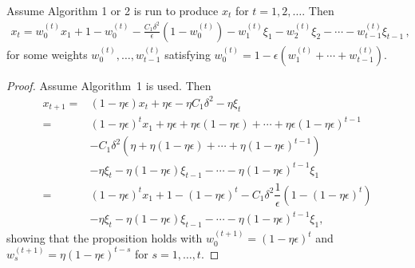 \documentclass[11pt,letterpaper,english]{article}
\begin{document}
\begin{proposition}
\label{prop1}
Assume Algorithm 1 or 2 is run to produce $x_t$ for $t=1,2,\ldots$. Then
\begin{align}
\label{eq:expression_x_t}
x_{t} = w^{(t)}_0 x_1 + 1-w^{(t)}_0 -\frac{C_1 \delta^2}{\epsilon}(1-w^{(t)}_0) -w^{(t)}_1 \xi_1 - w^{(t)}_2 \xi_2 - \cdots - w^{(t)}_{t-1} \xi_{t-1} \,,
\end{align}
for some weights $w^{(t)}_0,\ldots,w^{(t)}_{t-1}$ satisfying
$w^{(t)}_0 = 1-\epsilon (w^{(t)}_1+\cdots+w^{(t)}_{t-1})$.
\end{proposition}
\begin{proof}
Assume Algorithm~1 is used. Then
\begin{align*}
x_{t+1} =& (1-\eta \epsilon) x_{t} + \eta \epsilon - \eta C_1 \delta^2-\eta \xi_{t}\\
=&  \left(1-\eta \epsilon\right)^t x_1+ \eta \epsilon+\eta \epsilon\left(1-\eta \epsilon\right)+\cdots + \eta \epsilon\left(1-\eta \epsilon\right)^{t-1}\\
&-C_1 \delta^2\left( \eta + \eta\left( 1-\eta \epsilon \right)+\cdots + \eta \left(1-\eta \epsilon\right)^{t-1} \right) \\
&-\eta \xi_t -\eta \left(1-\eta \epsilon\right)\xi_{t-1}- \cdots -\eta \left(1-\eta \epsilon\right)^{t-1}\xi_{1}\\
=& \left(1-\eta \epsilon\right)^t x_1+ 1-\left(1-\eta \epsilon \right)^t
-C_1 \delta^2 \dfrac{1}{\epsilon}\left( 1-\left(1-\eta \epsilon \right)^t \right)\\
&- \eta \xi_t -\eta \left(1-\eta \epsilon\right)\xi_{t-1}- \cdots -\eta \left(1-\eta \epsilon\right)^{t-1}\xi_{1},
\end{align*}
showing that the proposition holds with $w^{(t+1)}_0=(1-\eta \epsilon)^t$ and $w^{(t+1)}_s= \eta (1-\eta\epsilon)^{t-s}$ for $s=1,\ldots,t$.

\medskip


\end{proof}
\end{document}
